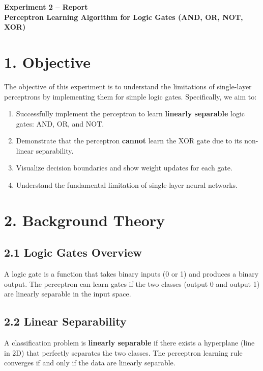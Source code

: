 \documentclass[11pt]{article}
\begin{document}
\clearpage


\begin{center}
\Large\textbf{Experiment 2 -- Report}\\
\large\textbf{Perceptron Learning Algorithm for Logic Gates (AND, OR, NOT, XOR)}
\end{center}

\section*{1. Objective}
The objective of this experiment is to understand the limitations of single-layer perceptrons by implementing them for simple logic gates. Specifically, we aim to:
\begin{enumerate}[leftmargin=*]
\item Successfully implement the perceptron to learn \textbf{linearly separable} logic gates: AND, OR, and NOT.
\item Demonstrate that the perceptron \textbf{cannot} learn the XOR gate due to its non-linear separability.
\item Visualize decision boundaries and show weight updates for each gate.
\item Understand the fundamental limitation of single-layer neural networks.
\end{enumerate}

\section*{2. Background Theory}

\subsection*{2.1 Logic Gates Overview}
A logic gate is a function that takes binary inputs (0 or 1) and produces a binary output. The perceptron can learn gates if the two classes (output 0 and output 1) are linearly separable in the input space.

\subsection*{2.2 Linear Separability}
A classification problem is \textbf{linearly separable} if there exists a hyperplane (line in 2D) that perfectly separates the two classes. The perceptron learning rule converges if and only if the data are linearly separable.
\end{document}

